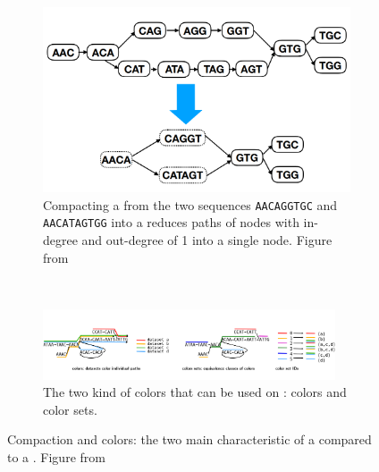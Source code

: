 \begin{figure}[h!]
	\centering
	\begin{subfigure}[b]{0.95\textwidth}
		\centering
		\includegraphics[width=.75\linewidth]{figures/background/compacting.png}
		\caption[Compacting a \dbg.]{Compacting a \dbg from the two sequences \texttt{AACAGGTGC} and \texttt{AACATAGTGG} into a \cdbg reduces paths of nodes with in-degree and out-degree of 1 into a single node. Figure from~\cite{embedding_dbg}}
	\end{subfigure}%
	\\
	\begin{subfigure}[b]{0.95\textwidth}
		\centering
		\includegraphics[width=0.95\textwidth]{figures/background/colors_dbg.png}
		\caption[The colors in a \ccdbg.]{The two kind of colors that can be used on \ccdbg: colors and color sets.} 
	\end{subfigure}%
	\caption[Compaction and colors in a \ccdbg.]{Compaction and colors: the two main characteristic of a \ccdbg compared to a \dbg. Figure from~\cite{marchet_kmersets}}
	\label{fig:ccdbg}
\end{figure}


